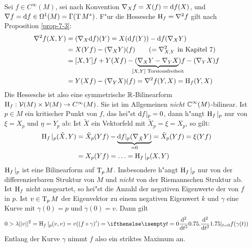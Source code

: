 Sei $f \in C^\infty(M)$, sei nach Konvention $\nabla_X f = X(f) = \mathrm{d}
f(X)$, und $\nabla f = \mathrm{d} f \in \Omega^1(M) = \Gamma(\operatorname{T} M^*)$. F"ur
die Hessesche $\operatorname{H}_f = \nabla^2 f$ gilt nach Proposition
\ref{prop-7-3}:
\begin{align*}
  \nabla^2 f (X,Y) &= (\nabla_X \dop f)(Y) = X(\dop f(Y)) - \dop f(\nabla_X Y)\\
  &= X(Yf) - (\nabla_X Y)(f) \qquad (= \nabla_{X,Y}^2 \text{ in Kapitel 7})\\
  &= [X,Y]f + Y(Xf) - (\underbrace{\nabla_X Y - \nabla_Y X}_{\mathclap{[X,Y] \text{ Torsionsfreiheit}}}) f - (\nabla_Y X) f\\
  &= Y(Xf) - (\nabla_YX)(f) = \nabla^2 f(Y,X) = \Hh_f(Y,X)
\end{align*}
Die Hessesche ist also eine symmetrische $\operatorname{\mathbb{R}}$-Bilinearform $\operatorname{H}_f:
\operatorname{\mathcal{V}}(M) \times \operatorname{\mathcal{V}}(M) \to C^\infty(M)$. Sie ist im Allgemeinen
\emph{nicht} $\operatorname{\mathbb{C}}^\infty(M)$-bilinear. Ist $p \in M$ ein kritischer
Punkt von $f$, das hei"st $\mathrm{d} f|_p = 0$, dann h"angt $\operatorname{H}_f|_p$ nur
von $\xi = X_p$ und $\eta = Y_p$ ab: Ist $\tilde X$ ein Vektorfeld mit
$\tilde X_p = \xi = X_p$, so gilt:
\begin{align*}
  \operatorname{H}_f|_p(\tilde X,Y) &= \tilde X_p(Yf) - \underbrace{\mathrm{d} f|_p(\nabla_{\tilde X}Y)}_{=0} = \tilde X_p(Yf) = \xi(Yf)\\
  &= X_p(Yf) = \ldots = \operatorname{H}_f|_p(X,Y)
\end{align*}
$\operatorname{H}_f|_p$ ist eine Bilinearform auf $\operatorname{T}_pM$. Insbesondere h"angt
$\operatorname{H}_f|_p$ nur von der differenzierbaren Struktur von $M$ und
\emph{nicht} von der Riemannschen Struktur ab.  Ist $\operatorname{H}_f$ nicht
ausgeartet, so hei"st die Anzahl der negativen Eigenwerte der
 von $f$ in $p$.  Ist $v \in \operatorname{T}_pM$ der Eigenvektor zu
einem negativen Eigenwert $k$ und $\gamma$ eine Kurve mit
$\gamma(0)=p$ und $\dot\gamma(0)=v$. Dann gilt
\begin{align*}
  0 > \lambda || v ||^2 = \Hh_f|_p (v,v) = v((f \circ \gamma)') =
  \difffrac[t=0]{^2}{t^2} f(\gamma(t))
\end{align*}
Entlang der Kurve $\gamma$ nimmt $f$ also ein striktes Maximum an.
